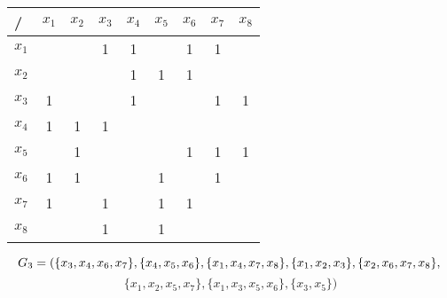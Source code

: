\documentclass[12pt]{article}
\begin{document}
\begin{enumerate}
\begin{tabular}{|l|c|c|c|c|c|c|c|c|}
\hline
/     & \multicolumn{1}{l|}{$x_1$} & \multicolumn{1}{l|}{$x_2$} & \multicolumn{1}{l|}{$x_3$} & \multicolumn{1}{l|}{$x_4$} & \multicolumn{1}{l|}{$x_5$} & \multicolumn{1}{l|}{$x_6$} & \multicolumn{1}{l|}{$x_7$} & \multicolumn{1}{l|}{$x_8$} \\ \hline
$x_1$ &                            &                            & 1                          & 1                          &                            & 1                          & 1                          &                            \\ \hline
$x_2$ &                            &                            &                            & 1                          & 1                          & 1                          &                            &                            \\ \hline
$x_3$ & 1                          &                            &                            & 1                          &                            &                            & 1                          & 1                          \\ \hline
$x_4$ & 1                          & 1                          & 1                          &                            &                            &                            &                            &                            \\ \hline
$x_5$ &                            & 1                          &                            &                            &                            & 1                          & 1                          & 1                          \\ \hline
$x_6$ & 1                          & 1                          &                            &                            & 1                          &                            & 1                          &                            \\ \hline
$x_7$ & 1                          &                            & 1                          &                            & 1                          & 1                          &                            &                            \\ \hline
$x_8$ &                            &                            & 1                          &                            & 1                          &                            &                            &                            \\ \hline
\end{tabular}
\begin{equation*}
    G_3 = (\{x_3,x_4,x_6,x_7\},\{x_4,x_5,x_6\},\{x_1,x_4,x_7,x_8\},\{x_1,x_2,x_3\},\{x_2,x_6,x_7,x_8\}, \\
\end{equation*}
\begin{equation*}
    \{x_1,x_2,x_5,x_7\},\{x_1,x_3,x_5,x_6\},\{x_3,x_5\})
\end{equation*}


\end{enumerate}
\end{document}
